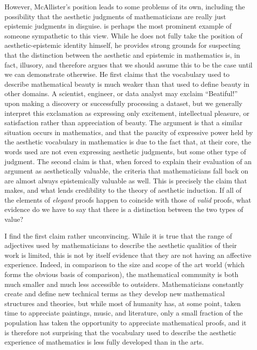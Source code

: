 \documentclass[a4paper,man,natbib]{apa6}
\begin{document}
However, McAllister's position leads to some problems of its own, including the possibility that the aesthetic
judgments of mathematicians are really just epistemic judgments in disguise. \cite{todd_unmasking_2008} is perhaps
the most prominent example of someone sympathetic to this view. While he does not fully take the position  of 
aesthetic-epistemic identity himself, he provides strong grounds for suspecting that the distinction between the 
aesthetic and epistemic in mathematics is, in fact, illusory, and therefore argues that we should assume this to be 
the case until we can demonstrate otherwise. He first  claims that the vocabulary used to
describe mathematical beauty is much weaker than that used to define beauty in other domains. A scientist, engineer,
or data analyst may exclaim ``Beatiful!'' upon making a discovery or successfully processing a dataset, but we generally
interpret this exclamation as expressing only excitement, intellectual pleasure, or satisfaction rather than appreciation
of beauty. The argument is that a similar situation occurs in mathematics, and that the paucity of expressive power held
by the aesthetic vocabulary in mathematics is due to the fact that, at their core, the words used are not even expressing 
aesthetic judgments, but some other type of judgment. The second claim is that, when forced to explain their evaluation 
of an argument as aesthetically valuable, the criteria that mathematicians fall back on are almost always epistemically 
valuable as well. This is precisely the claim that \cite{mcallister_mathematical_2005} makes, and what lends credibility
to the theory of aesthetic induction. If all of the elements of \textit{elegant} proofs happen to coincide with those of 
\textit{valid} proofs, what evidence do we have to say that there is a distinction between the two types of value?

I find the first claim rather unconvincing. While it is true that the range of adjectives used by mathematicians to describe
the aesthetic qualities of their work is limited, this is not by itself evidence that they are not having an affective
experience. Indeed, in comparison to the size and scope of the art world (which forms the obvious basis of comparison),
the mathematical community is both much smaller and much less accessible to outsiders. Mathematicians constantly create 
and define new technical terms as they develop new mathematical structures and theories, but while most of humanity has,
at some point, taken time to appreciate paintings, music, and literature, only a small fraction of the population has 
taken the opportunity to appreciate mathematical proofs, and it is therefore not surprising that the vocabulary used 
to describe the aesthetic experience of mathematics is less fully developed than in the arts.
\end{document}
